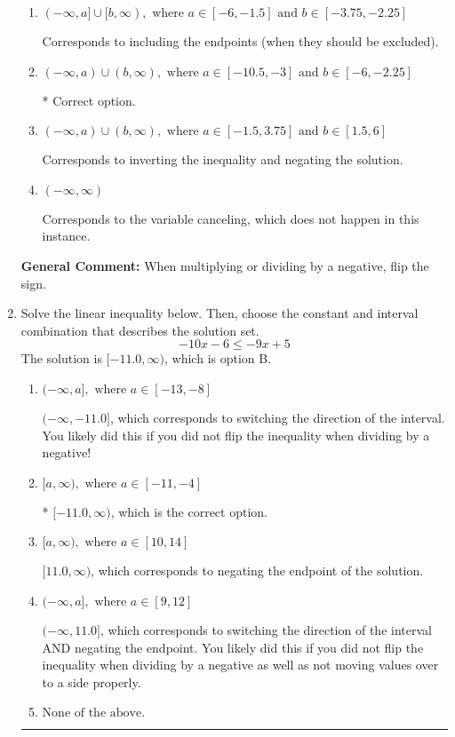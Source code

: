 \documentclass{extbook}[14pt]
\newcommand{\litem}[1]{\item #1

\rule{\textwidth}{0.4pt}}
\begin{document}
\begin{enumerate}
{\begin{enumerate}[label=\Alph*.]
Corresponds to including the endpoints AND negating.
\item \( (-\infty, a] \cup [b, \infty), \text{ where } a \in [-6, -1.5] \text{ and } b \in [-3.75, -2.25] \)

Corresponds to including the endpoints (when they should be excluded).
\item \( (-\infty, a) \cup (b, \infty), \text{ where } a \in [-10.5, -3] \text{ and } b \in [-6, -2.25] \)

 * Correct option.
\item \( (-\infty, a) \cup (b, \infty), \text{ where } a \in [-1.5, 3.75] \text{ and } b \in [1.5, 6] \)

Corresponds to inverting the inequality and negating the solution.
\item \( (-\infty, \infty) \)

Corresponds to the variable canceling, which does not happen in this instance.
\end{enumerate}

\textbf{General Comment:} When multiplying or dividing by a negative, flip the sign.
}
\litem{
Solve the linear inequality below. Then, choose the constant and interval combination that describes the solution set.
\[ -10x -6 \leq -9x + 5 \]The solution is \( [-11.0, \infty) \), which is option B.\begin{enumerate}[label=\Alph*.]
\item \( (-\infty, a], \text{ where } a \in [-13, -8] \)

 $(-\infty, -11.0]$, which corresponds to switching the direction of the interval. You likely did this if you did not flip the inequality when dividing by a negative!
\item \( [a, \infty), \text{ where } a \in [-11, -4] \)

* $[-11.0, \infty)$, which is the correct option.
\item \( [a, \infty), \text{ where } a \in [10, 14] \)

 $[11.0, \infty)$, which corresponds to negating the endpoint of the solution.
\item \( (-\infty, a], \text{ where } a \in [9, 12] \)

 $(-\infty, 11.0]$, which corresponds to switching the direction of the interval AND negating the endpoint. You likely did this if you did not flip the inequality when dividing by a negative as well as not moving values over to a side properly.
\item \( \text{None of the above}. \)


\end{enumerate}}
\end{enumerate}
\end{document}
